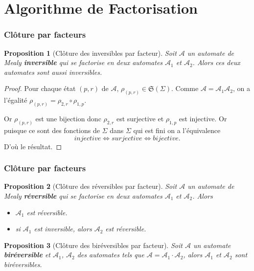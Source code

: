 \documentclass[11pt]{beamer}
\newtheorem{prop}{Proposition}
\begin{document}
\section{Algorithme de Factorisation}

\begin{frame}
  \frametitle{Clôture par facteurs}
  \begin{prop}[Clôture des inversibles par facteur]
    Soit $\mathcal{A}$ un automate de Mealy \textbf{inversible} qui se factorise en deux automates $\mathcal{A}_1$ et $\mathcal{A}_2$. Alors ces deux automates sont aussi inversibles.
  \end{prop}

  \begin{proof}
    Pour chaque état $(p, r)$ de $\mathcal{A}$, $\rho_{(p, r)}\in \mathfrak{S}(\Sigma)$. Comme $\mathcal{A}=\mathcal{A}_1\mathcal{A}_2$, on a l'égalité $\rho_{(p, r)}=\rho_{2,r}\circ\rho_{1,p}$.

    Or $\rho_{(p, r)}$ est une bijection donc $\rho_{2,r}$ est surjective et ${\rho_{1,p}}$ est injective. Or puisque ce sont des fonctions de $\Sigma$ dans $\Sigma$ qui est fini on a l'équivalence
    \[ injective \iff surjective \iff bijective. \]
    D'où le résultat.
  \end{proof}

\end{frame}

\begin{frame}
  \frametitle{Clôture par facteurs}
  \begin{prop}[Clôture des réversibles par facteur]
    Soit $\mathcal{A}$ un automate de Mealy \textbf{réversible} qui se factorise en deux automates $\mathcal{A}_1$ et $\mathcal{A}_2$. Alors
    \begin{itemize}
    \item $\mathcal{A}_1$ est réversible.
    \item si $\mathcal{A}_1$ est inversible, alors $\mathcal{A}_2$ est réversible.
    \end{itemize}
  \end{prop}

  \begin{prop}[Clôture des biréversibles par facteur]
    Soit $\mathcal{A}$ un automate \textbf{biréversible} et $\mathcal{A}_1$, $\mathcal{A}_2$ des automates tels que $\mathcal{A}=\mathcal{A}_1\cdot\mathcal{A}_2$, alors $\mathcal{A}_1$ et $\mathcal{A}_2$ sont biréversibles.
  \end{prop}

\end{frame}
\end{document}
